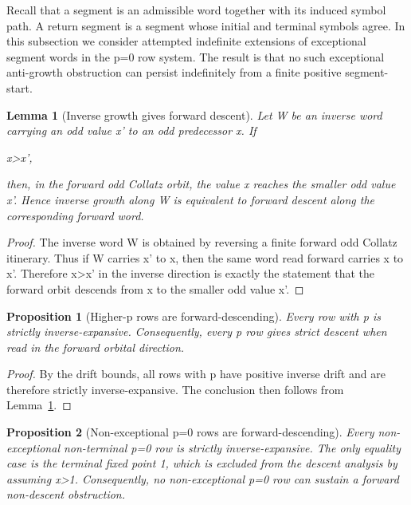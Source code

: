 \documentclass[11pt,letterpaper]{amsart}
\def\({}%
\def\){}%
\def\[{ }%
\def\]{ }%
\theoremstyle{definition}
\theoremstyle{plain}
\newtheorem{lemma}{Lemma}
\newtheorem{proposition}{Proposition}
\theoremstyle{plain}
\theoremstyle{remark}
\begin{document}
Recall that a segment is an admissible word together with its induced
symbol path.  A return segment is a segment whose initial and terminal
symbols agree.  In this subsection we consider attempted indefinite
extensions of exceptional segment words in the \(p=0\) row system.  The
result is that no such exceptional anti-growth obstruction can persist
indefinitely from a finite positive segment-start.

\begin{lemma}[Inverse growth gives forward descent]
\label{lem:inverse-growth-forward-descent}
Let \(W\) be an inverse word carrying an odd value \(x'\) to an odd
predecessor \(x\).  If
\[
x>x',
\]
then, in the forward odd Collatz orbit, the value \(x\) reaches the
smaller odd value \(x'\).  Hence inverse growth along \(W\) is equivalent
to forward descent along the corresponding forward word.
\end{lemma}

\begin{proof}
The inverse word \(W\) is obtained by reversing a finite forward odd
Collatz itinerary.  Thus if \(W\) carries \(x'\) to \(x\), then the same
word read forward carries \(x\) to \(x'\).  Therefore \(x>x'\) in the
inverse direction is exactly the statement that the forward orbit descends
from \(x\) to the smaller odd value \(x'\).
\end{proof}

\begin{proposition}[Higher-\(p\) rows are forward-descending]
\label{prop:higher-p-forward-descending}
Every row with \(p\) is strictly inverse-expansive.  Consequently,
every \(p\) row gives strict descent when read in the forward
orbital direction.
\end{proposition}

\begin{proof}
By the drift bounds, all rows with \(p\) have positive inverse
drift and are therefore strictly inverse-expansive.  The conclusion then
follows from Lemma~\ref{lem:inverse-growth-forward-descent}.
\end{proof}

\begin{proposition}[Non-exceptional \(p=0\) rows are forward-descending]
\label{prop:nonexceptional-p0-forward-descending}
Every non-exceptional non-terminal \(p=0\) row is strictly
inverse-expansive.  The only equality case is the terminal fixed point
\(1\), which is excluded from the descent analysis by assuming
\(x>1\).  Consequently, no non-exceptional \(p=0\) row can sustain a
forward non-descent obstruction.
\end{proposition}
\end{document}
